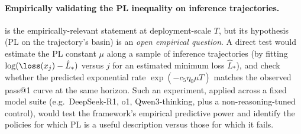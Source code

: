 \paragraph{Empirically validating the PL inequality on inference trajectories.}
 is the empirically-relevant statement at
deployment-scale $T$, but its hypothesis (PL on the trajectory's basin)
is an \emph{open empirical question}. A direct test would estimate the
PL constant $\mu$ along a sample of inference trajectories (by fitting
$\log(\loss(x_j) - \hat L_*)$ versus $j$ for an estimated minimum loss
$\hat L_*$), and check whether the predicted exponential rate
$\exp(-c_5 \eta_0 \mu T)$ matches the observed pass@1 curve at the same
horizon. Such an experiment, applied across a fixed model suite (e.g.\
DeepSeek-R1, o1, Qwen3-thinking, plus a non-reasoning-tuned control),
would test the framework's empirical predictive power and identify
the policies for which PL is a useful description versus those for
which it fails.
